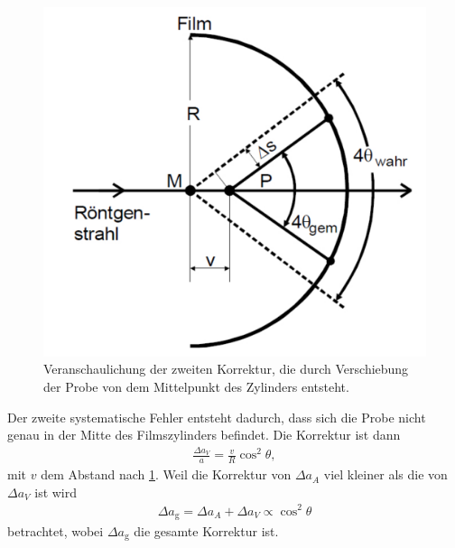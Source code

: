 \begin{figure}[h!]
	\centering
	\includegraphics[scale=0.4]{../Grafiken/ZweiteKorrektur.pdf}
	\caption{Veranschaulichung der zweiten Korrektur, die durch Verschiebung der Probe von dem Mittelpunkt des Zylinders entsteht.\cite{V41}}\label{fig:ZweiteKorrektur}
\end{figure}
\FloatBarrier
Der zweite systematische Fehler entsteht dadurch, dass sich die Probe nicht genau in der Mitte des Filmszylinders befindet. Die Korrektur ist dann
\begin{align}
	\frac{\Delta a_V}{a}=\frac{v}{R}\cos^2\theta,
\end{align}
mit $v$ dem Abstand nach \cref{fig:ZweiteKorrektur}. Weil die Korrektur von $\Delta a_A$ viel kleiner als die von $\Delta a_V$ ist wird 
\begin{align}
	\Delta a_\text{g}=\Delta a_A+ \Delta a_V \propto \cos^2\theta
\end{align}
betrachtet, wobei $\Delta a_\text{g}$ die gesamte Korrektur ist.